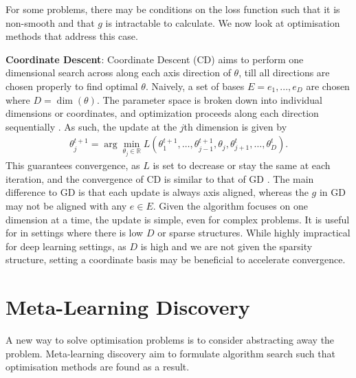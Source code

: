 For some problems, there may be conditions on the loss function such that it is non-smooth and that $g$ is intractable to calculate. We now look at optimisation methods that address this case.

\textbf{Coordinate Descent}: Coordinate Descent (CD) aims to perform one dimensional search across along each axis direction of $\theta$, till all directions are chosen properly to find optimal $\theta$. Naively, a set of bases $E = {e_1, ..., e_D }$ are chosen where $D = \dim(\theta)$. The parameter space is broken down into individual dimensions or coordinates, and optimization proceeds along each direction sequentially \citep{conn2009derivfree}. As such, the update at the $j$th dimension is given by
\begin{align}
    \theta^{t+1}_j = \arg\min_{\theta_j \in \mathbb{R}} L(\theta^{t+1}_1, \dots, \theta^{t+1}_{j-1}, \theta_j, \theta^t_{j+1}, \dots, \theta^t_D).
\end{align}
This guarantees convergence, as $L$ is set to decrease or stay the same at each iteration, and the convergence of CD is similar to that of GD \citep{conn2009derivfree}. The main difference to GD is that each update is always axis aligned, whereas the $g$ in GD may not be aligned with any $e \in E$. Given the algorithm focuses on one dimension at a time, the update is simple, even for complex problems. It is useful for in settings where there is low $D$ or sparse structures. While highly impractical for deep learning settings, as $D$ is high and we are not given the sparsity structure, setting a coordinate basis may be beneficial to accelerate convergence.

\section{Meta-Learning Discovery}
\label{sec:meta_learning_discovery}

A new way to solve optimisation problems is to consider abstracting away the problem. Meta-learning discovery aim to formulate algorithm search such that optimisation methods are found as a result.

